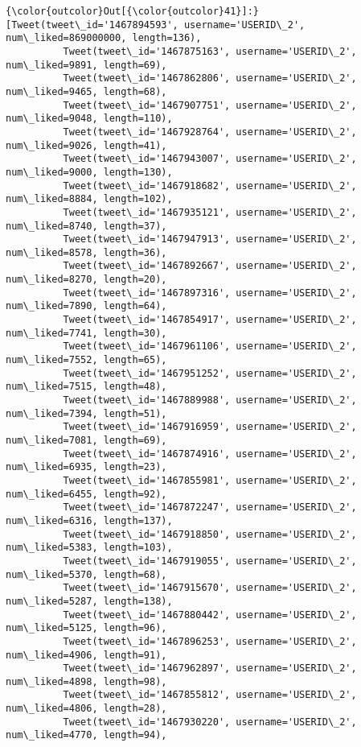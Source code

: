 \documentclass[11pt]{article}
\begin{document}
\begin{Verbatim}[commandchars=\\\{\}]
{\color{outcolor}Out[{\color{outcolor}41}]:} [Tweet(tweet\_id='1467894593', username='USERID\_2', num\_liked=869000000, length=136),
          Tweet(tweet\_id='1467875163', username='USERID\_2', num\_liked=9891, length=69),
          Tweet(tweet\_id='1467862806', username='USERID\_2', num\_liked=9465, length=68),
          Tweet(tweet\_id='1467907751', username='USERID\_2', num\_liked=9048, length=110),
          Tweet(tweet\_id='1467928764', username='USERID\_2', num\_liked=9026, length=41),
          Tweet(tweet\_id='1467943007', username='USERID\_2', num\_liked=9000, length=130),
          Tweet(tweet\_id='1467918682', username='USERID\_2', num\_liked=8884, length=102),
          Tweet(tweet\_id='1467935121', username='USERID\_2', num\_liked=8740, length=37),
          Tweet(tweet\_id='1467947913', username='USERID\_2', num\_liked=8578, length=36),
          Tweet(tweet\_id='1467892667', username='USERID\_2', num\_liked=8270, length=20),
          Tweet(tweet\_id='1467897316', username='USERID\_2', num\_liked=7890, length=64),
          Tweet(tweet\_id='1467854917', username='USERID\_2', num\_liked=7741, length=30),
          Tweet(tweet\_id='1467961106', username='USERID\_2', num\_liked=7552, length=65),
          Tweet(tweet\_id='1467951252', username='USERID\_2', num\_liked=7515, length=48),
          Tweet(tweet\_id='1467889988', username='USERID\_2', num\_liked=7394, length=51),
          Tweet(tweet\_id='1467916959', username='USERID\_2', num\_liked=7081, length=69),
          Tweet(tweet\_id='1467874916', username='USERID\_2', num\_liked=6935, length=23),
          Tweet(tweet\_id='1467855981', username='USERID\_2', num\_liked=6455, length=92),
          Tweet(tweet\_id='1467872247', username='USERID\_2', num\_liked=6316, length=137),
          Tweet(tweet\_id='1467918850', username='USERID\_2', num\_liked=5383, length=103),
          Tweet(tweet\_id='1467919055', username='USERID\_2', num\_liked=5370, length=68),
          Tweet(tweet\_id='1467915670', username='USERID\_2', num\_liked=5287, length=138),
          Tweet(tweet\_id='1467880442', username='USERID\_2', num\_liked=5125, length=96),
          Tweet(tweet\_id='1467896253', username='USERID\_2', num\_liked=4906, length=91),
          Tweet(tweet\_id='1467962897', username='USERID\_2', num\_liked=4898, length=98),
          Tweet(tweet\_id='1467855812', username='USERID\_2', num\_liked=4806, length=28),
          Tweet(tweet\_id='1467930220', username='USERID\_2', num\_liked=4770, length=94),

\end{Verbatim}
\end{document}
